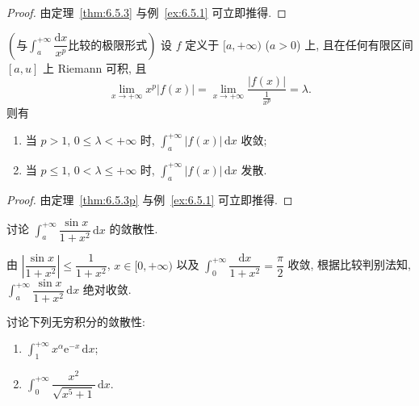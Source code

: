 \begin{proof}
由定理~\ref{thm:6.5.3} 与例~\ref{ex:6.5.1} 可立即推得.
\end{proof}

\begin{corollaryp}\label{cor:6.5.1p}
$\left(\text{与}\int_{a}^{+\infty}\dfrac{\mathrm{d}x}{x^{p}}\text{比较的极限形式}\right)$ 设 $f$ 定义于 $[a,+\infty)$ ($a>0$) 上, 且在任何有限区间 $[a,u]$ 上 Riemann 可积, 且
\[
\lim_{x\to+\infty}x^{p}|f(x)|=\lim_{x\to+\infty}\frac{|f(x)|}{\frac{1}{x^{p}}}=\lambda.
\]
则有
\begin{enumerate}[label=(\arabic*)]
\item 当 $p>1$, $0\leqslant\lambda<+\infty$ 时, $\int_{a}^{+\infty}|f(x)|\,\mathrm{d}x$ 收敛;
\item 当 $p\leqslant1$, $0<\lambda\leqslant+\infty$ 时, $\int_{a}^{+\infty}|f(x)|\,\mathrm{d}x$ 发散.
\end{enumerate}
\end{corollaryp}

\begin{proof}
由定理~\ref{thm:6.5.3p} 与例~\ref{ex:6.5.1} 可立即推得.
\end{proof}

\begin{example}\label{ex:6.5.10}
讨论 $\int_{a}^{+\infty}\dfrac{\sin x}{1+x^{2}}\,\mathrm{d}x$ 的敛散性.
\end{example}

\begin{solution}
由 $\left|\dfrac{\sin x}{1+x^{2}}\right|\leqslant\dfrac{1}{1+x^{2}}$, $x\in[0,+\infty)$ 以及 $\int_{0}^{+\infty}\dfrac{\mathrm{d}x}{1+x^{2}}=\dfrac{\pi}{2}$ 收敛, 根据比较判别法知, $\int_{a}^{+\infty}\dfrac{\sin x}{1+x^{2}}\,\mathrm{d}x$ 绝对收敛.
\end{solution}

\begin{example}\label{ex:6.5.11}
讨论下列无穷积分的敛散性:
\begin{enumerate}[label=(\arabic*)]
\item $\int_{1}^{+\infty}x^{\alpha}\mathrm{e}^{-x}\,\mathrm{d}x$;
\item $\int_{0}^{+\infty}\dfrac{x^{2}}{\sqrt{x^{5}+1}}\,\mathrm{d}x$.
\end{enumerate}
\end{example}

